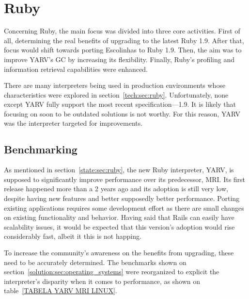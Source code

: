 \section{Ruby} %
\label{solution:sec:ruby}

Concerning Ruby, the main focus was divided into three core activities. First of all, determining the real benefits of upgrading to the latest Ruby 1.9. After that, focus would shift towards porting Escolinhas to Ruby 1.9. Then, the aim was to improve YARV's GC by increasing its flexibility. Finally, Ruby's profiling and information retrieval capabilities were enhanced.

There are many interpreters being used in production environments whose characteristics were explored in section~\ref{tech:sec:ruby}. Unfortunately, none except YARV fully support the most recent specification---1.9. It is likely that focusing on soon to be outdated solutions is not worthy. For this reason, YARV was the interpreter targeted for improvements.

\begin{comment}
Determine the benefits of upgrading to the latest version, 1.9

Improve ruby 1.9's GC (main weakpoint)

Add GC configurability

Improve Ruby 1.9's profiling abilities and information retrieval
\end{comment}

\subsection{Benchmarking}
As mentioned in section~\ref{state:sec:ruby}, the new Ruby interpreter, YARV, is supposed to significantly improve performance over its predecessor, MRI. Its first release happened more than a 2 years ago and its adoption is still very low, despite having new features and better supposedly better performance. Porting existing applications requires some development effort as there are small changes on existing functionality and behavior. Having said that Rails can easily have scalability issues, it would be expected that this version's adoption would rise considerably fast, albeit it this is not happing.

To increase the community's awareness on the benefits from upgrading, these need to be accurately determined. The benchmarks shown on section~\ref{solution:sec:operating_systems} were reorganized to explicit the interpreter's disparity when it comes to performance, as shown on table~\ref{TABELA YARV MRI LINUX}.

